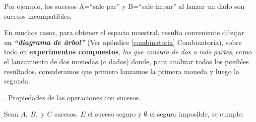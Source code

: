 Por ejemplo, los sucesos A=``sale par'' y B=``sale impar'' al lanzar un dado son sucesos incompatibles.

\begin{destacado}
En muchos casos, para obtener el espacio muestral, resulta conveniente dibujar un \emph{\textbf{``diagrama de árbol''}}  (Ver apéndice \ref{combinatoria} Combinatoria), sobre todo en \textbf{experimentos compuestos}, \emph{los que constan de dos o más partes}, como el lanzamiento de dos monedas (o dados) donde, para analizar todos los posibles resultados, consideramos que primero lanzamos la primera moneda y luego la segunda.
\end{destacado}


\begin{theorem}
. Propiedades de las operaciones con sucesos.

Sean $A,\ B, \text{ y } C$ sucesos. $E$ el suceso seguro y $\emptyset$ el seguro imposible, se cumple:


\end{theorem}
